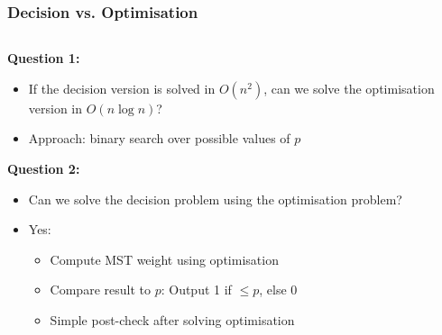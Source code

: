 \begin{frame}
  \frametitle{Decision vs. Optimisation}

  \begin{columns}
    \begin{column}{0.6\textwidth}
      \textbf{Question 1:}
      \begin{itemize}
          \item If the decision version is solved in $O(n^2)$, 
                can we solve the optimisation version in $O(n \log n)$?
          \item Approach: binary search over possible values of $p$
      \end{itemize}

      \vspace{0.4cm}
      \textbf{Question 2:}
      \begin{itemize}
          \item Can we solve the decision problem using the optimisation problem?
          \item Yes:
            \begin{itemize}
                \item Compute MST weight using optimisation
                \item Compare result to $p$: Output 1 if $\leq p$, else 0
                \item Simple post-check after solving optimisation
            \end{itemize}
      \end{itemize}
    \end{column}


\end{columns}
\end{frame}
